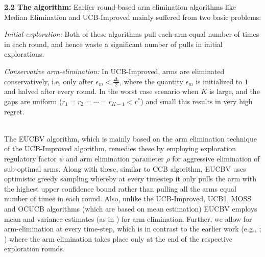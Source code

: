 \textbf{2.2 The algorithm:} Earlier round-based arm elimination algorithms like Median Elimination \citep{even2006action} and UCB-Improved mainly suffered from two basic problems: \\
\begin{inparaenum}[\bfseries(i)]
\item \textit{Initial exploration:} Both of these algorithms pull each arm equal number of times in each round, and hence waste a significant number of pulls in initial explorations. \\
\item \textit{Conservative arm-elimination:} In UCB-Improved, arms are eliminated conservatively, i.e, only after $\epsilon_{m}<\frac{\Delta_{i}}{2}$, 
where the quantity $\epsilon_{m}$ is initialized to $1$ and halved after every round. In the worst case scenario when $K$ is large, and the gaps are uniform  ($r_{1}=r_{2}=\cdots=r_{K-1}<r^{*}$) and small this results in very high regret.\\
\end{inparaenum}
\\
	The EUCBV algorithm, which is mainly based on the arm elimination technique of the UCB-Improved algorithm,  remedies these by employing exploration regulatory factor $\psi$ and arm elimination parameter $\rho$ for aggressive elimination of sub-optimal arms. Along with these, similar to CCB \citep{liu2016modification} algorithm, EUCBV uses optimistic greedy sampling whereby at every timestep it only pulls the arm with the highest upper confidence bound rather than pulling all the arms equal number of times in each round. Also, unlike the UCB-Improved, UCB1, MOSS and OCUCB algorithms (which are based on mean estimation) EUCBV employs mean and variance estimates (as in \citet{audibert2009exploration}) for arm elimination. Further, we allow for arm-elimination at every time-step, which is in contrast to the earlier work (e.g., \citet{auer2010ucb}; \citet{even2006action}) where the arm elimination takes place only at the end of the respective exploration rounds. 




